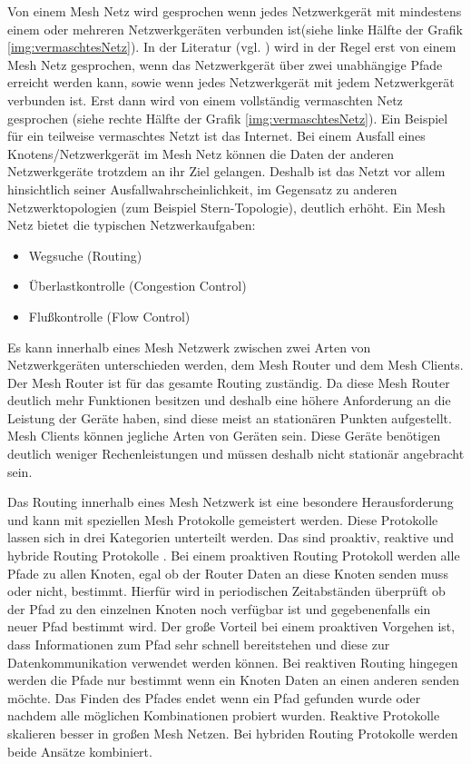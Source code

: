 Von einem Mesh Netz wird gesprochen wenn jedes Netzwerkgerät mit mindestens einem oder mehreren Netzwerkgeräten verbunden ist(siehe linke Hälfte der Grafik \ref{img:vermaschtesNetz}). In der Literatur (vgl. \cite{ conrads2013datenkommunikation}) wird in der Regel erst von einem Mesh Netz gesprochen, wenn das Netzwerkgerät über zwei unabhängige Pfade erreicht werden kann, sowie  wenn jedes Netzwerkgerät mit jedem Netzwerkgerät verbunden ist.  Erst dann wird von einem vollständig vermaschten Netz gesprochen (siehe rechte Hälfte der Grafik \ref{img:vermaschtesNetz}). Ein Beispiel für ein teilweise vermaschtes Netzt ist das Internet. 
Bei einem Ausfall eines Knotens/Netzwerkgerät im Mesh Netz können die Daten der anderen Netzwerkgeräte trotzdem an ihr Ziel gelangen. Deshalb ist das Netzt vor allem hinsichtlich seiner Ausfallwahrscheinlichkeit, im Gegensatz zu anderen Netzwerktopologien (zum Beispiel Stern-Topologie), deutlich erhöht. 
Ein Mesh Netz bietet die typischen Netzwerkaufgaben:
\begin{itemize}
	\item Wegsuche (Routing)
	\item Überlastkontrolle (Congestion Control)
	\item Flußkontrolle (Flow Control)
\end{itemize}
Es kann innerhalb eines Mesh Netzwerk zwischen zwei Arten von Netzwerkgeräten unterschieden werden, dem Mesh Router und dem Mesh Clients. Der Mesh Router ist für das gesamte Routing zuständig. Da diese Mesh Router deutlich mehr Funktionen besitzen und deshalb eine höhere Anforderung an die Leistung der Geräte haben, sind diese meist an stationären Punkten aufgestellt. Mesh Clients können jegliche Arten von Geräten sein. Diese Geräte benötigen deutlich weniger Rechenleistungen und müssen deshalb nicht stationär angebracht sein.


Das Routing innerhalb eines Mesh Netzwerk ist eine besondere Herausforderung und kann mit speziellen Mesh Protokolle gemeistert werden. Diese Protokolle lassen sich in drei Kategorien unterteilt werden. Das sind proaktiv, reaktive und hybride Routing Protokolle \cite{vijayakumar2012review}. Bei einem proaktiven Routing Protokoll werden alle Pfade zu allen Knoten, egal ob der Router Daten an diese Knoten senden muss oder nicht, bestimmt. Hierfür wird in periodischen Zeitabständen überprüft ob der Pfad zu den einzelnen Knoten noch verfügbar ist und gegebenenfalls ein neuer Pfad bestimmt wird. Der große Vorteil bei einem proaktiven Vorgehen ist, dass Informationen zum Pfad sehr schnell bereitstehen und diese zur Datenkommunikation verwendet werden können. Bei reaktiven Routing hingegen werden die Pfade nur bestimmt wenn ein Knoten Daten an einen anderen senden möchte. Das Finden des Pfades endet wenn ein Pfad gefunden wurde oder nachdem alle möglichen Kombinationen probiert wurden. Reaktive Protokolle skalieren besser in großen Mesh Netzen. Bei hybriden Routing Protokolle werden beide Ansätze kombiniert.

